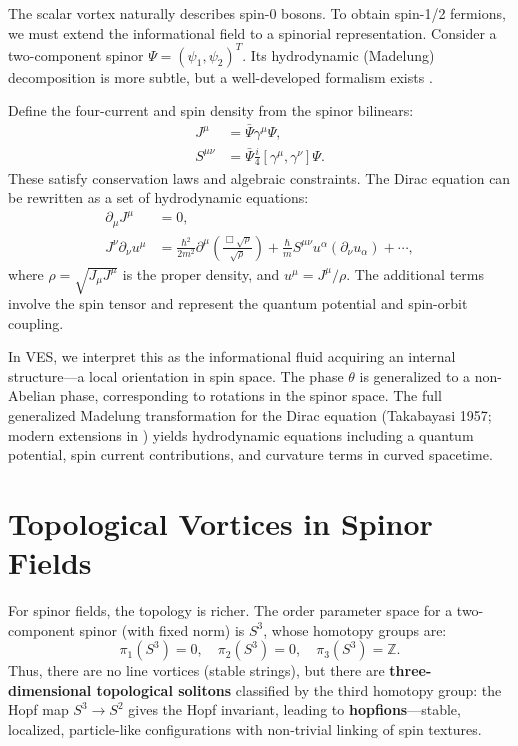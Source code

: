 \documentclass[12pt,a4paper]{book}
\begin{document}
The scalar vortex naturally describes spin-0 bosons. To obtain spin-1/2 fermions, we must extend the informational field to a spinorial representation. Consider a two-component spinor $\Psi = (\psi_1, \psi_2)^T$. Its hydrodynamic (Madelung) decomposition is more subtle, but a well-developed formalism exists \cite{takabayasi1957, holland1993}.

Define the four-current and spin density from the spinor bilinears:
\begin{align}
    J^\mu &= \bar{\Psi} \gamma^\mu \Psi, \\
    S^{\mu\nu} &= \bar{\Psi} \frac{i}{4}[\gamma^\mu, \gamma^\nu] \Psi.
\end{align}
These satisfy conservation laws and algebraic constraints. The Dirac equation can be rewritten as a set of hydrodynamic equations:
\begin{align}
    \partial_\mu J^\mu &= 0, \\
    J^\nu \partial_\nu u^\mu &= \frac{\hbar^2}{2m^2} \partial^\mu \left( \frac{\Box \sqrt{\rho}}{\sqrt{\rho}} \right) + \frac{\hbar}{m} S^{\mu\nu} u^\alpha (\partial_\nu u_\alpha) + \cdots,
\end{align}
where $\rho = \sqrt{J_\mu J^\mu}$ is the proper density, and $u^\mu = J^\mu / \rho$. The additional terms involve the spin tensor and represent the quantum potential and spin-orbit coupling.

In VES, we interpret this as the informational fluid acquiring an internal structure—a local orientation in spin space. The phase $\theta$ is generalized to a non-Abelian phase, corresponding to rotations in the spinor space. The full generalized Madelung transformation for the Dirac equation (Takabayasi 1957; modern extensions in \cite{matos2021}) yields hydrodynamic equations including a quantum potential, spin current contributions, and curvature terms in curved spacetime.

\section{Topological Vortices in Spinor Fields}

For spinor fields, the topology is richer. The order parameter space for a two-component spinor (with fixed norm) is $S^3$, whose homotopy groups are:
\begin{equation}
    \pi_1(S^3) = 0, \quad \pi_2(S^3) = 0, \quad \pi_3(S^3) = \mathbb{Z}.
\end{equation}
Thus, there are no line vortices (stable strings), but there are \textbf{three-dimensional topological solitons} classified by the third homotopy group: the Hopf map $S^3 \to S^2$ gives the Hopf invariant, leading to \textbf{hopfions}—stable, localized, particle-like configurations with non-trivial linking of spin textures.
\end{document}
